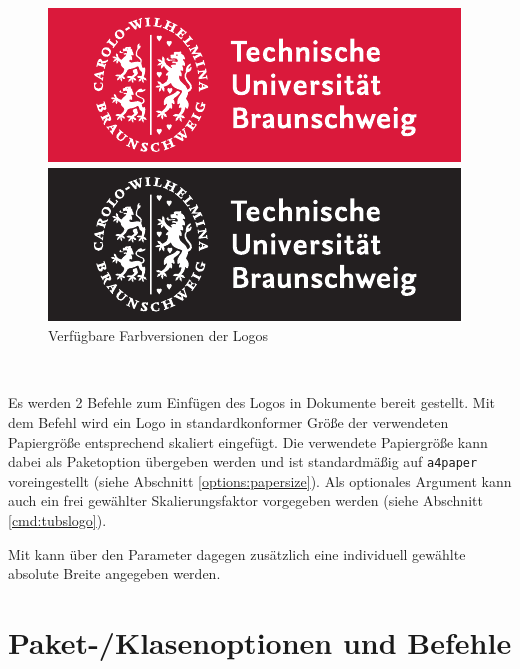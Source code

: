 \begin{figure}[!ht]
\begin{minipage}{0.5\textwidth}
  \centering
  \includegraphics[width=\tubslogoBaseWidth]{TUBraunschweig_SC}
\end{minipage}
\begin{minipage}{0.5\textwidth}
  \centering
  \includegraphics[width=\tubslogoBaseWidth]{TUBraunschweig_B}
\end{minipage}
\caption{Verfügbare Farbversionen der Logos}
\end{figure}

\begin{Declaration}
  \\
\end{Declaration}


Es werden 2 Befehle zum Einfügen des Logos in Dokumente bereit gestellt.
Mit dem Befehl  wird ein Logo in
standardkonformer Größe der verwendeten Papiergröße entsprechend skaliert
eingefügt. Die verwendete Papiergröße kann dabei als Paketoption übergeben
werden und ist standardmäßig auf \lstinline{a4paper} voreingestellt
(siehe Abschnitt \ref{options:papersize}).
Als optionales Argument kann auch ein frei gewählter Skalierungsfaktor
vorgegeben werden (siehe Abschnitt \ref{cmd:tubslogo}).

Mit  kann über den Parameter  dagegen
zusätzlich eine individuell gewählte absolute Breite angegeben werden.


\section{Paket-/Klasenoptionen und Befehle}

